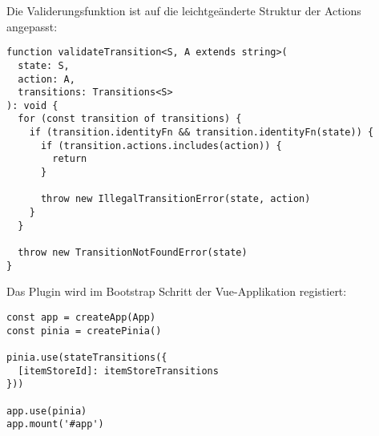 Die Validerungsfunktion ist auf die leichtgeänderte Struktur der Actions angepasst:

\begin{lstlisting}
function validateTransition<S, A extends string>(
  state: S,
  action: A,
  transitions: Transitions<S>
): void {
  for (const transition of transitions) {
    if (transition.identityFn && transition.identityFn(state)) {
      if (transition.actions.includes(action)) {
        return
      }

      throw new IllegalTransitionError(state, action)
    }
  }

  throw new TransitionNotFoundError(state)
}
\end{lstlisting}

Das Plugin wird im Bootstrap Schritt der Vue-Applikation registiert:

\begin{lstlisting}
const app = createApp(App)
const pinia = createPinia()

pinia.use(stateTransitions({
  [itemStoreId]: itemStoreTransitions
}))

app.use(pinia)
app.mount('#app')
\end{lstlisting}

